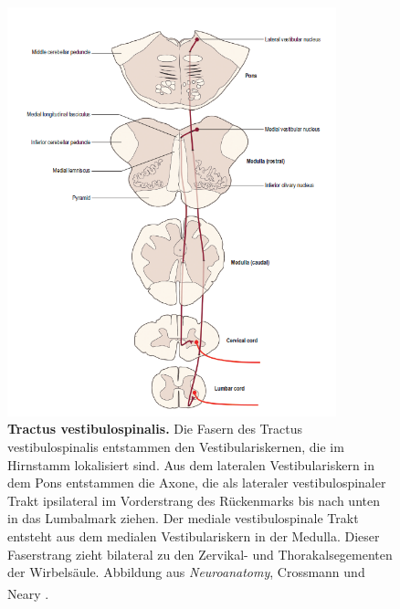 \documentclass[12pt,a4paper,pdftex]{article}
\begin{document}
\begin{figure}[H]
    \centering
    \includegraphics[width=0.85\textwidth]{pictures/Bilder_Laura/vestibulospinal_tract.PNG}
    \caption[Tractus vestibulospinalis]{\textbf{Tractus vestibulospinalis.} Die Fasern des Tractus vestibulospinalis entstammen den Vestibulariskernen, die im Hirnstamm lokalisiert sind. Aus dem lateralen Vestibulariskern in dem Pons entstammen die Axone, die als lateraler vestibulospinaler Trakt ipsilateral im Vorderstrang des Rückenmarks bis nach unten in das Lumbalmark ziehen. Der mediale vestibulospinale Trakt entsteht aus dem medialen Vestibulariskern in der Medulla. Dieser Faserstrang zieht bilateral zu den Zervikal- und Thorakalsegementen der Wirbelsäule. Abbildung aus \textit{Neuroanatomy}, Crossmann und Neary \textsuperscript{\cite[8]{crossman2014neuroanatomy}}.}
    \label{fig:tr_vestibulospinalis}
\end{figure}
\end{document}
